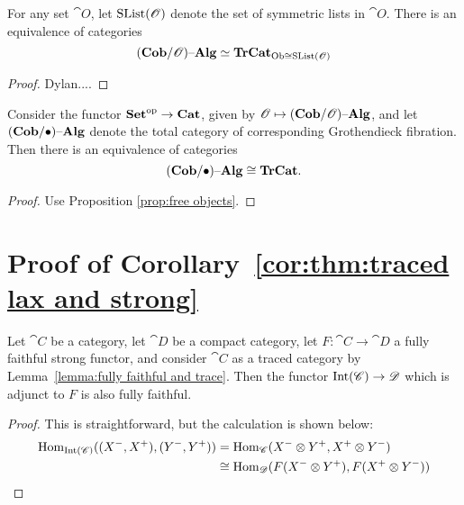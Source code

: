 \documentclass[12pt,oneside,article,draft]{memoir}
\begin{document}
\begin{theorem}
For any set $\cat{O}$, let $\textnormal{SList}(\mathscr{O})$ denote the set of symmetric lists in $\cat{O}$. There is an equivalence of categories 
 $$(\mathbf{Cob}/\mathscr{O}){\text \textendash}\mathbf{Alg}\simeq\mathbf{TrCat}_{{\operatorname{Ob}\cong}\textnormal{SList}(\mathscr{O})}$$
\end{theorem}
\begin{proof}
 Dylan....
\end{proof}

\begin{corollary}\label{cor:traced as cob-alg}

Consider the functor ${\mathbf{Set}}^{\text{op}}\to\mathbf{Cat}$, given by $\mathscr{O}\mapsto(\mathbf{Cob}/\mathscr{O}){\text \textendash}\mathbf{Alg}$, and let $(\mathbf{Cob}/\bullet){\text \textendash}\mathbf{Alg}$ denote the total category of corresponding Grothendieck fibration. Then there is an equivalence of categories
$$(\mathbf{Cob}/\bullet){\text \textendash}\mathbf{Alg}\cong\mathbf{TrCat}.$$

\end{corollary}

\begin{proof}

Use Proposition \ref{prop:free objects}.

\end{proof}

\section{Proof of Corollary~\ref{cor:thm:traced lax and strong}}

\begin{lemma}\label{lemma:more fully faithfulness}
	Let $\cat{C}$ be a category, let $\cat{D}$ be a compact category, let $F\colon\cat{C}\to\cat{D}$ a fully faithful strong functor, and consider $\cat{C}$ as a traced category by Lemma~\ref{lemma:fully faithful and trace}. Then the functor $\operatorname{Int}(\mathscr{C})\to\mathscr{D}$ which is adjunct to $F$ is also fully faithful.
\end{lemma}

\begin{proof}
This is straightforward, but the calculation is  shown below:
\begin{align*}
\operatorname{Hom}_{\operatorname{Int}(\mathscr{C})}((X^-,X^+),(Y^-,Y^+))&=\operatorname{Hom}_{\mathscr{C}}(X^-\otimes Y^+,X^+\otimes Y^-)\\
&\cong\operatorname{Hom}_{\mathscr{D}}(F(X^-\otimes Y^+),F(X^+\otimes Y^-))\\
\end{align*}

\end{proof}
\end{document}
